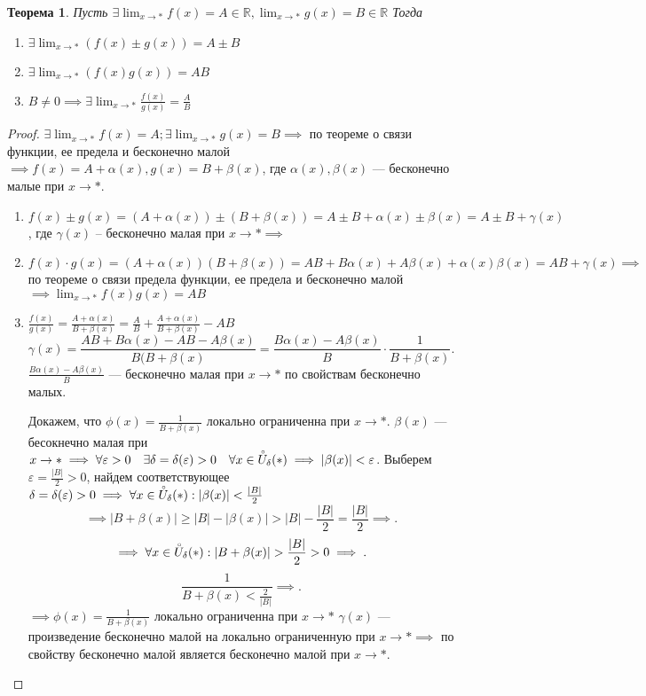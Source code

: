 \documentclass[a4paper,12pt]{article} %
\newtheorem{theorem}{Теорема}[subsection]
\theoremstyle{remark}
\begin{document}
\begin{theorem}
	Пусть $\exists \lim_{x \to *} f(x) = A \in  \mathbb{R}, \lim_{x \to *} g(x) = B\in  \mathbb{R}$
	Тогда
	\begin{enumerate}
		\item $\exists \lim_{x \to *} (f(x) \pm g(x)) = A\pm B$
		\item $\exists \lim_{x \to *} (f(x) g(x)) = AB$ 
		\item $B \neq 0 \implies \exists  \lim_{x \to *} \frac{f(x)}{g(x)} = \frac{A}{B}$
	\end{enumerate}
\end{theorem}
\begin{proof}
	$\exists  \lim_{x \to *} f(x) = A; \exists  \lim_{x \to *} g(x) = B \implies$ по теореме о связи функции, ее предела и бесконечно малой $\implies f(x) = A + \alpha(x), g(x) = B + \beta(x)$, где $\alpha(x), \beta(x)$ --- бесконечно малые при $x\to *$.
	
	\begin{enumerate}
		\item $f(x)\pm g(x) = (A + \alpha(x)) \pm (B+ \beta(x)) = A \pm B +\alpha(x) \pm \beta(x) = A \pm B + \gamma(x)$, где $\gamma(x)$ -- бесконечно малая при  $x \to * \implies$
		\item $f(x) \cdot  g(x) = (A + \alpha(x))(B+\beta(x))= AB+B\alpha(x)+A\beta(x) + \alpha(x)\beta(x) = AB + \gamma(x) \implies$ по теореме о связи предела функции, ее предела и бесконечно малой $\implies \lim_{x \to *} f(x)g(x) = AB$
		\item $\frac{f(x)}{g(x)} = \frac{A+\alpha(x)}{B+\beta(x)} = \frac{A}{B} + \frac{A+\alpha(x)}{B + \beta(x)} - AB$
			\[
			\gamma(x) = \frac{AB+B\alpha(x)-AB-A\beta(x)}{B(B+\beta(x)} = \frac{B\alpha(x)-A\beta(x)}{B} \cdot \frac{1}{B+\beta(x)}
			.\] 
			$\frac{B\alpha(x)-A\beta(x)}{B}$ --- бесконечно малая при $x \to  *$ по свойствам бесконечно малых.
			
			Докажем, что $\phi(x)= \frac{1}{B+\beta(x)}$ локально ограниченна при $x \to *$.
			$\beta(x)$ --- бесокнечно малая при $x \to * \implies \forall \varepsilon> 0 \quad \exists \delta=\delta(\varepsilon)>0 \quad \forall x\in \accentset    {\circ}{U}_\delta(*) \implies |\beta(x)| < \varepsilon$.
			Выберем $\varepsilon= \frac{|B|}{2}>0$, найдем соответствующее $\delta=\delta(\varepsilon)>0 \implies \forall  x \in  \accentset{\circ}{U}_\delta(*) : |\beta(x)| < \frac{|B|}{2}$ 
			\[
			\implies |B+\beta(x)| \ge  |B| - |\beta(x)| > |B| - \frac{|B|}{2} = \frac{|B|}{2} \implies
			.\] 
			\[
			\implies \forall x \in  \accentset{\circ}{U}_\delta(*) : |B + \beta(x)| > \frac{|B|}{2} >0 \implies
			.\] 
			\[
			\frac{1}{B+\beta(x)<\frac{2}{|B|}} \implies 
			.\]
			$\implies\phi(x) = \frac{1}{B+\beta(x)}$ локально ограниченна при  $x \to  *$
			$\gamma(x)$ --- произведение бесконечно малой на локально ограниченную при $x \to  *\implies$ по свойству бесконечно малой является бесконечно малой при $x \to *$.
	\end{enumerate}
\end{proof}
\end{document}
